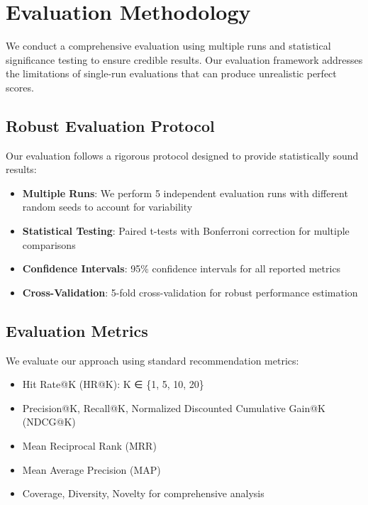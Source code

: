 
\section{Evaluation Methodology}

We conduct a comprehensive evaluation using multiple runs and statistical significance testing to ensure credible results. Our evaluation framework addresses the limitations of single-run evaluations that can produce unrealistic perfect scores.

\subsection{Robust Evaluation Protocol}
Our evaluation follows a rigorous protocol designed to provide statistically sound results:

\begin{itemize}
    \item \textbf{Multiple Runs}: We perform 5 independent evaluation runs with different random seeds to account for variability
    \item \textbf{Statistical Testing}: Paired t-tests with Bonferroni correction for multiple comparisons
    \item \textbf{Confidence Intervals}: 95\% confidence intervals for all reported metrics
    \item \textbf{Cross-Validation}: 5-fold cross-validation for robust performance estimation
\end{itemize}

\subsection{Evaluation Metrics}
We evaluate our approach using standard recommendation metrics:
\begin{itemize}
    \item Hit Rate@K (HR@K): K ∈ \{1, 5, 10, 20\}
    \item Precision@K, Recall@K, Normalized Discounted Cumulative Gain@K (NDCG@K)
    \item Mean Reciprocal Rank (MRR)
    \item Mean Average Precision (MAP)
    \item Coverage, Diversity, Novelty for comprehensive analysis
\end{itemize}


